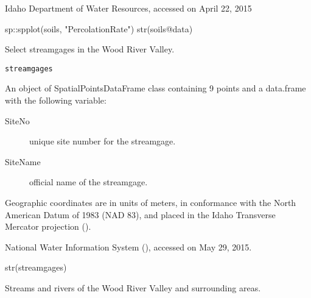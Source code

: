 \documentclass[a4paper]{book}
\begin{document}
%
\begin{Source}\relax
Idaho Department of Water Resources, accessed on April 22, 2015
\end{Source}
%
\begin{Examples}
\begin{ExampleCode}
sp::spplot(soils, "PercolationRate")
str(soils@data)

\end{ExampleCode}
\end{Examples}
%
\begin{Description}\relax
Select streamgages in the Wood River Valley.
\end{Description}
%
\begin{Usage}
\begin{verbatim}
streamgages
\end{verbatim}
\end{Usage}
%
\begin{Format}
An object of SpatialPointsDataFrame class containing 9 points and a
data.frame with the following variable:
\begin{description}

\item[SiteNo] unique site number for the streamgage.
\item[SiteName] official name of the streamgage.

\end{description}

Geographic coordinates are in units of meters, in conformance with the
North American Datum of 1983 (NAD 83), and placed in the
Idaho Transverse Mercator projection ().
\end{Format}
%
\begin{Source}\relax
National Water Information System (),
accessed on May 29, 2015.
\end{Source}
%
\begin{Examples}
\begin{ExampleCode}
str(streamgages)

\end{ExampleCode}
\end{Examples}
%
\begin{Description}\relax
Streams and rivers of the Wood River Valley and surrounding areas.
\end{Description}
\end{document}
